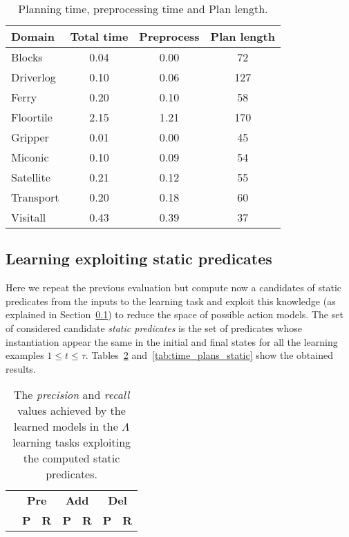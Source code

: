 \documentclass[letterpaper]{article} %
\begin{document}
\begin{table}[hbt!]
\begin{small}
	\begin{center}
		\begin{tabular}{l|c|c|c|}			 
			Domain & Total time & Preprocess & Plan length  \\
			\hline
			Blocks & 0.04 & 0.00 & 72  \\
			Driverlog & 0.10 & 0.06 & 127 \\
			Ferry & 0.20 & 0.10 & 58 \\
			Floortile & 2.15 & 1.21 & 170 \\
			Gripper & 0.01 & 0.00 & 45 \\
			Miconic & 0.10 & 0.09 & 54  \\
			Satellite & 0.21 & 0.12 & 55 \\
			Transport & 0.20 & 0.18 & 60 \\
			Visitall & 0.43 & 0.39 & 37 			
		\end{tabular}
	\end{center}
        \end{small}
	\caption{\small Planning time, preprocessing time and Plan length.}
	\label{tab:time_plans}	
\end{table}

\subsection{Learning exploiting static predicates}
Here we repeat the previous evaluation but compute now a candidates of static predicates from the inputs to the learning task and exploit this knowledge (as explained in Section~\ref{}) to reduce the space of possible action models. The set of considered candidate {\em static predicates} is the set of predicates whose instantiation appear the same in the initial and final states for all the learning examples {\small $1\leq t\leq \tau$}. Tables~\ref{tab:results_plans_static} and~\ref{tab:time_plans_static} show the obtained results.	

\begin{table}[hbt!]
\begin{small}
	\begin{center}
		\begin{tabular}{l|l|l|l|l|l|l|}
			 & \multicolumn{2}{|c|}{\bf Pre} & \multicolumn{2}{|c|}{\bf Add} & \multicolumn{2}{|c|}{\bf Del}  \\ \cline{2-7}			 
			  & \multicolumn{1}{|c|}{\bf P} & \multicolumn{1}{|c|}{\bf R} & \multicolumn{1}{|c|}{\bf P} & \multicolumn{1}{|c|}{\bf R} & \multicolumn{1}{|c|}{\bf P} & \multicolumn{1}{|c|}{\bf R} \\
			\hline 
		\end{tabular}
	\end{center}
	\end{small}
\caption{\small The {\em precision} and {\em recall} values achieved by the learned models in the $\Lambda$ learning tasks exploiting the computed static predicates.}
\label{tab:results_plans_static}
\end{table}
\end{document}
